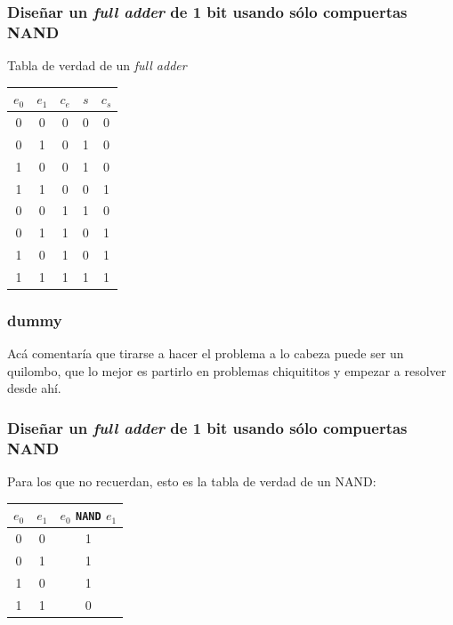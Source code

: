 \documentclass[mathserif,hyperref]{beamer}
\begin{document}
\begin{frame}
\frametitle{\small Diseñar un \textit{full adder} de 1 bit usando sólo
compuertas NAND}
Tabla de verdad de un \textit{full adder}
\begin{center}\begin{tabular}{| c | c | c || c | c |}
  \hline
  $e_0$ & $e_1$ & $c_e$ & $s$ & $c_s$ \\ \hline
    0   &   0   &   0   &  0  &   0   \\
    0   &   1   &   0   &  1  &   0   \\
    1   &   0   &   0   &  1  &   0   \\
    1   &   1   &   0   &  0  &   1   \\
    0   &   0   &   1   &  1  &   0   \\
    0   &   1   &   1   &  0  &   1   \\
    1   &   0   &   1   &  0  &   1   \\
    1   &   1   &   1   &  1  &   1   \\
  \hline
\end{tabular}\end{center}
\end{frame}


\begin{frame}
\frametitle{dummy}
Acá comentaría que tirarse a hacer el problema a lo cabeza puede ser un
quilombo, que lo mejor es partirlo en problemas chiquititos y empezar a
resolver desde ahí.
\end{frame}


\begin{frame}
\frametitle{\small Diseñar un \textit{full adder} de 1 bit usando sólo
compuertas NAND}
Para los que no recuerdan, esto es la tabla de verdad de un NAND:
\begin{center}\begin{tabular}{| c | c || c |}
  \hline
  $e_0$ & $e_1$ & $e_0$ \texttt{NAND} $e_1$ \\ \hline
    0   &   0   &             1             \\
    0   &   1   &             1             \\
    1   &   0   &             1             \\
    1   &   1   &             0             \\
  \hline
\end{tabular}\end{center}
\end{frame}
\end{document}
